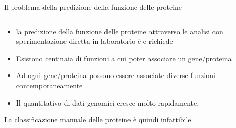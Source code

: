 \documentclass{beamer}
\begin{document}
\begin{tframe}{\small Il problema della predizione della funzione delle proteine}
  \begin{columns}
    \begin{column}{.75\textwidth}
      \minipage[c][0.4\textheight][s]{\columnwidth}
	   \begin{itemize}	
	  \item la predizione della funzione delle proteine attraverso le analisi con sperimentazione diretta in laboratorio è  e richiede 
	  \onslide<2->
	  \item Esistono centinaia di funzioni a cui poter associare un gene/proteina 
	  \onslide<3->
	  \item Ad ogni gene/proteina possono essere associate diverse funzioni contemporaneamente 
	  \item Il quantitativo di dati genomici cresce molto rapidamente.
      \end{itemize}
      La classificazione manuale delle proteine è quindi infattibile.
      \endminipage      
    \end{column}
    \begin{column}{.25\textwidth}



    \end{column}
  \end{columns}

\end{tframe}
\end{document}
